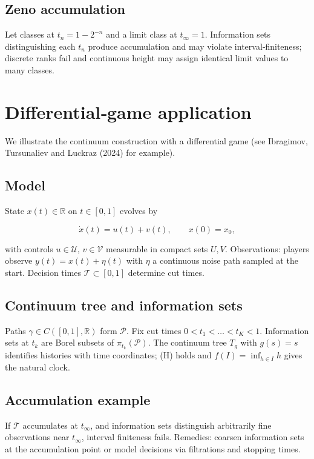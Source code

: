 \documentclass[11pt]{article}
\begin{document}
\subsection{Zeno accumulation}
Let classes at \(t_n=1-2^{-n}\) and a limit class at \(t_\infty=1\).
Information sets distinguishing each \(t_n\) produce accumulation and
may violate interval‑finiteness; discrete ranks fail and continuous
height may assign identical limit values to many classes.

\section{Differential‑game application}\label{sec:differential}
We illustrate the continuum construction with a differential game (see Ibragimov, Tursunaliev and Luckraz (2024) for example).

\subsection{Model}
State \(x(t)\in\mathbb R\) on \(t\in[0,1]\) evolves by


\[
\dot x(t)=u(t)+v(t),\qquad x(0)=x_0,
\]


with controls \(u\in\mathcal U\), \(v\in\mathcal V\) measurable in
compact sets \(U,V\). Observations: players observe \(y(t)=x(t)+\eta(t)\)
with \(\eta\) a continuous noise path sampled at the start. Decision
times \(\mathcal T\subset[0,1]\) determine cut times.

\subsection{Continuum tree and information sets}
Paths \(\gamma\in C([0,1],\mathbb R)\) form \(\mathcal P\). Fix cut times
\(0<t_1<\dots<t_K<1\). Information sets at \(t_k\) are Borel subsets of
\(\pi_{t_k}(\mathcal P)\). The continuum tree \(T_g\) with \(g(s)=s\)
identifies histories with time coordinates; (H) holds and \(f(I)=\inf_{h\in I}h\)
gives the natural clock.

\subsection{Accumulation example}
If \(\mathcal T\) accumulates at \(t_\infty\), and information sets
distinguish arbitrarily fine observations near \(t_\infty\), interval
finiteness fails. Remedies: coarsen information sets at the accumulation
point or model decisions via filtrations and stopping times.
\end{document}

